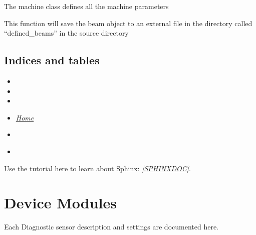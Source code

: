 \documentclass[letterpaper,10pt,english]{sphinxmanual}
\begin{document}

\begin{fulllineitems}
\label{machine:machine.staticmachine}
The machine class defines all the machine parameters

\begin{fulllineitems}
\label{machine:machine.staticmachine.save}
This function will save the beam object to an external file in the directory called ``defined\_beams'' in the source directory

\end{fulllineitems}


\end{fulllineitems}



\subsection{Indices and tables}
\label{machine:indices-and-tables}\begin{itemize}
\item {} 

\item {} 

\item {} 

\item {} 
{\hyperref[index::doc]{\emph{\emph{Home}}}}

\item {} 
{\hyperref[index:index-label]{\emph{}}}

\item {} 
{\hyperref[beam:beam-label]{\emph{}}}

\end{itemize}

Use the tutorial here to learn about Sphinx: \label{machine:id1}{\hyperref[machine:sphinxdoc]{\emph{{[}SPHINXDOC{]}}}}.


\section{Device Modules}
\label{device_modules::doc}\label{device_modules:device-modules}
Each Diagnostic sensor description and settings are documented here.
\end{document}

